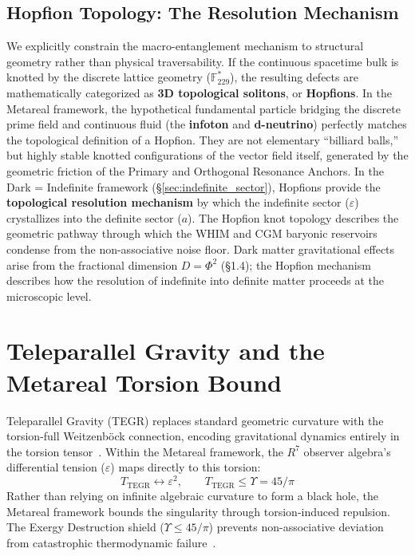 \subsection{Hopfion Topology: The Resolution Mechanism}
We explicitly constrain the macro-entanglement mechanism to structural geometry rather than physical traversability. If the continuous spacetime bulk is knotted by the discrete lattice geometry ($\mathbb{F}_{229}^*$), the resulting defects are mathematically categorized as \textbf{3D topological solitons}, or \textbf{Hopfions}. 
In the Metareal framework, the hypothetical fundamental particle bridging the discrete prime field and continuous fluid (the \textbf{infoton} and \textbf{d-neutrino}) perfectly matches the topological definition of a Hopfion. They are not elementary ``billiard balls,'' but highly stable knotted configurations of the vector field itself, generated by the geometric friction of the Primary and Orthogonal Resonance Anchors. In the Dark = Indefinite framework (\S\ref{sec:indefinite_sector}), Hopfions provide the \textbf{topological resolution mechanism} by which the indefinite sector ($\varepsilon$) crystallizes into the definite sector ($a$). The Hopfion knot topology describes the geometric pathway through which the WHIM and CGM baryonic reservoirs condense from the non-associative noise floor. Dark matter gravitational effects arise from the fractional dimension $D = \Phi^2$ (\S1.4); the Hopfion mechanism describes how the resolution of indefinite into definite matter proceeds at the microscopic level.

\section{Teleparallel Gravity and the Metareal Torsion Bound}

Teleparallel Gravity (TEGR) replaces standard geometric curvature with the torsion-full Weitzenb\"{o}ck connection, encoding gravitational dynamics entirely in the torsion tensor~\cite{maluf2013, bahamonde2023}. Within the Metareal framework, the $R^7$ observer algebra's differential tension ($\varepsilon$) maps directly to this torsion:
\begin{equation}
    T_{\text{TEGR}} \longleftrightarrow \varepsilon^2, \qquad T_{\text{TEGR}} \leq \Upsilon = 45/\pi
\end{equation}
Rather than relying on infinite algebraic curvature to form a black hole, the Metareal framework bounds the singularity through torsion-induced repulsion. The Exergy Destruction shield ($\Upsilon \leq 45/\pi$) prevents non-associative deviation from catastrophic thermodynamic failure~\cite{layden2025}.

